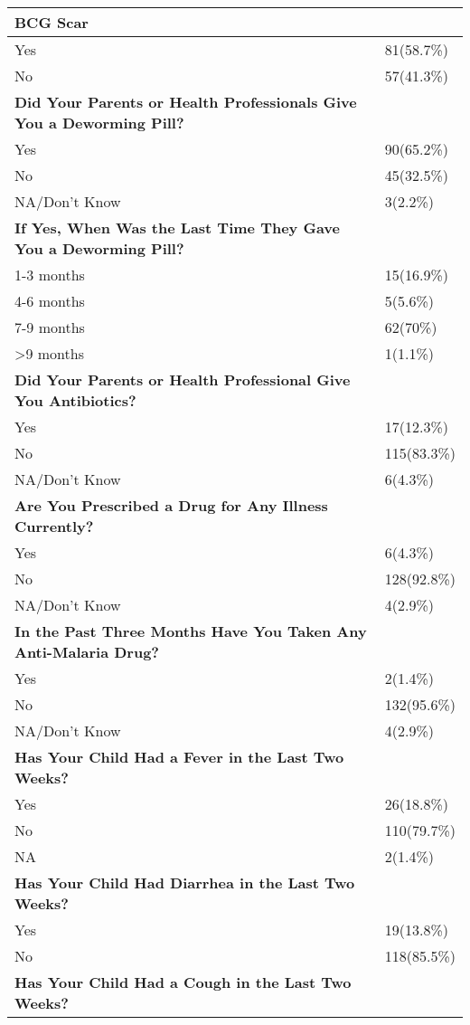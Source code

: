 \documentclass[6pt,letterpaper]{article}
\begin{document}
 \begin{tabular}{|l  l|}
 \hline
 \textbf{BCG Scar} \\
 \hline
 Yes & 81(58.7\%) \\
 No & 57(41.3\%) \\
 \hline
 \textbf{Did Your Parents or Health Professionals Give You a Deworming Pill?} \\
 \hline
 Yes & 90(65.2\%) \\
 No & 45(32.5\%) \\
 NA/Don't Know & 3(2.2\%) \\
 \hline
 \textbf{If Yes, When Was the Last Time They Gave You a Deworming Pill?} \\
 \hline
 1-3 months & 15(16.9\%) \\
 4-6 months & 5(5.6\%) \\
 7-9 months & 62(70\%) \\
 \textgreater 9 months & 1(1.1\%) \\
 \hline
 \textbf{Did Your Parents or Health Professional Give You Antibiotics?} \\
 \hline
 Yes & 17(12.3\%) \\
 No & 115(83.3\%) \\
 NA/Don't Know & 6(4.3\%) \\
 \hline
 \textbf{Are You Prescribed a Drug for Any Illness Currently?} \\
 \hline
 Yes & 6(4.3\%) \\
 No & 128(92.8\%) \\
 NA/Don't Know & 4(2.9\%) \\
 \hline
 \textbf{In the Past Three Months Have You Taken Any Anti-Malaria Drug?} \\
 \hline
 Yes & 2(1.4\%) \\
 No & 132(95.6\%) \\
 NA/Don't Know & 4(2.9\%) \\
 \hline
 \textbf{Has Your Child Had a Fever in the Last Two Weeks?} \\
 \hline
 Yes & 26(18.8\%) \\
 No & 110(79.7\%) \\
 NA & 2(1.4\%) \\
\hline
\textbf{Has Your Child Had Diarrhea in the Last Two Weeks?} \\
\hline
Yes & 19(13.8\%) \\
No & 118(85.5\%) \\
\hline
\textbf{Has Your Child Had a Cough in the Last Two Weeks?} \\
\hline

\end{tabular}
\end{document}
